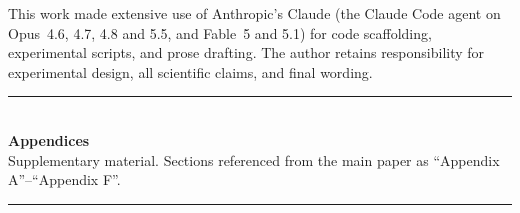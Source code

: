 \documentclass{article}
\begin{document}
\begin{ack}
This work made extensive use of Anthropic's Claude (the Claude Code agent on
Opus~4.6, 4.7, 4.8 and 5.5, and Fable~5 and 5.1) for code scaffolding, experimental scripts, and
prose drafting. The author retains responsibility for experimental design, all
scientific claims, and final wording.
\end{ack}



\appendix
\newpage
\begin{center}
  \rule{0.5\linewidth}{0.4pt}\\[0.6em]
  {\Large\bfseries Appendices}\\[0.25em]
  {\small Supplementary material. Sections referenced from the main
   paper as ``Appendix A''--``Appendix F''.}\\[0.4em]
  \rule{0.5\linewidth}{0.4pt}
\end{center}
\vspace{0.5em}







\end{document}
